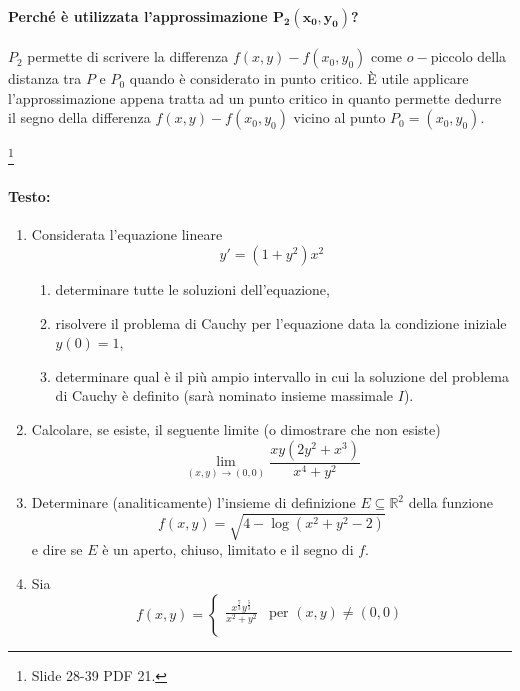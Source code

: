\paragraph{Perché è utilizzata l'approssimazione $\boldsymbol{P_2(x_0,y_0)}$?} $P_2$ permette di scrivere la differenza $f(x,y)-f(x_0,y_0)$ come $o-$piccolo della distanza tra $P$ e $P_0$ quando è considerato in punto critico. È utile applicare l'approssimazione appena tratta ad un punto critico in quanto permette dedurre il segno della differenza $f(x,y)-f(x_0,y_0)$ vicino al punto $P_0 = (x_0,y_0)$.

\begin{example}
	\footnote{Slide 28-39 PDF 21.}
	\paragraph{Testo:}
	\begin{enumerate}
		\item Considerata l'equazione lineare
		\begin{equation}\label{eq:edo_varib_sep_esempio}
			y'=(1+y^2)x^2
		\end{equation}
		\begin{enumerate}
			\item determinare tutte le soluzioni dell'equazione,
			\item risolvere il problema di Cauchy per l'equazione data la condizione iniziale $y(0)=1$,
			\item determinare qual è il più ampio intervallo in cui la soluzione del problema di Cauchy è definito (sarà nominato insieme massimale $I$).
		\end{enumerate}
		\item Calcolare, se esiste, il seguente limite (o dimostrare che non esiste)
		\begin{equation*}
			\lim_{(x,y)\rightarrow(0,0)}\frac{xy(2y^2+x^3)}{x^4+y^2}
		\end{equation*}
		\item Determinare (analiticamente) l'insieme di definizione $E\subseteq\mathbb{R}^2$ della funzione
		\begin{equation*}
			f(x,y)=\sqrt{4-\log(x^2+y^2-2)}
		\end{equation*}
		e dire se $E$ è un aperto, chiuso, limitato e il segno di $f$.
		\item Sia
		\begin{equation*}
			f(x,y) = 
			\begin{cases}
				\frac{x^{\frac{7}{3}}y^{\frac{5}{3}}}{x^2+y^2} &\text{per } (x,y)\neq(0,0)\\

\end{cases}
\end{equation*}
\end{enumerate}
\end{example}
